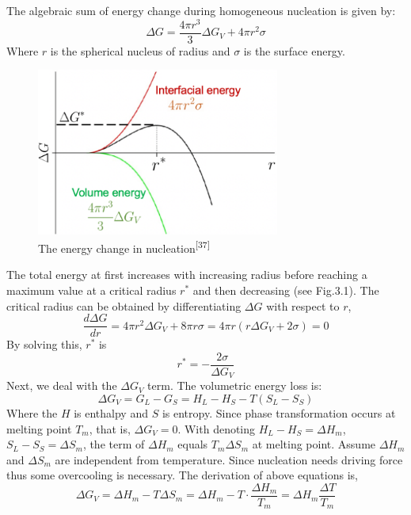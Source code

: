 The algebraic sum of  energy change during homogeneous nucleation is given by:
\begin{equation}
\Delta G=\frac{4 \pi r^{3}}{3} \Delta G_{V}+4 \pi r^{2} \sigma  
\tag{3.1.4}
\end{equation}
Where $r$ is the spherical nucleus of radius and $\sigma $ is the surface energy.
\begin{figure}[H]
\centering
\includegraphics[width=8cm]{src/fig/fig31.png}
\caption{The energy change in nucleation\textsuperscript{[37]}}
\end{figure}
The total energy at ﬁrst increases with increasing radius before reaching a maximum value at a critical radius $r^{*}$ and then decreasing (see Fig.3.1). The critical radius can be obtained by diﬀerentiating $\Delta G$ with respect to $r$, 
\begin{equation}
\frac{d \Delta G}{d r}=4 \pi r^{2} \Delta G_{V}+8 \pi r \sigma=4 \pi r\left(r \Delta G_{V}+2 \sigma\right)=0
\tag{3.1.5}
\end{equation}
By solving this,  $r^{*}$ is
\begin{equation}
r^{*}=-\frac{2 \sigma}{\Delta G_{V}}
\tag{3.1.6}
\end{equation}
Next,  we deal with the $\Delta G_{V}$ term.
The volumetric energy loss is:
\begin{equation}
\Delta G_{V}=G_{L}-G_{S}=H_{L}-H_{S}-T\left(S_{L}-S_{S}\right)
\tag{3.1.7}
\end{equation}
Where the $H$ is enthalpy and $S$ is entropy. Since phase transformation occurs at melting point $T_{m}$, that is, $\Delta G_{V}=0$. With denoting $H_{L}-H_{S}=\Delta H_{m}$, $S_{L}-S_{S}=\Delta S_{m}$, the term of $\Delta H_{m}$ equals  $T_{m}\Delta S_{m}$  at melting point.  Assume $\Delta H_{m}$ and $\Delta S_{m}$  are independent from temperature. Since nucleation needs driving force thus some overcooling is necessary.  
The derivation of above equations is,
\begin{equation}
\Delta G_{V}=\Delta H_{m}-T \Delta S_{m}=\Delta H_{m}-T \cdot \frac{\Delta H_{m}}{T_{m}}=\Delta H_{m} \frac{\Delta T}{T_{m}}
\tag{3.1.8}
\end{equation}
